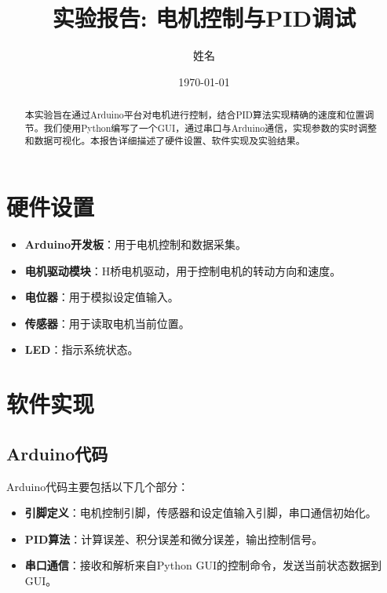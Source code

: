 \documentclass{article}
\title{实验报告: 电机控制与PID调试}
\author{姓名}
\date{\today}
\begin{document}
\maketitle

\begin{abstract}
本实验旨在通过Arduino平台对电机进行控制，结合PID算法实现精确的速度和位置调节。我们使用Python编写了一个GUI，通过串口与Arduino通信，实现参数的实时调整和数据可视化。本报告详细描述了硬件设置、软件实现及实验结果。
\end{abstract}

\section{硬件设置}
\begin{itemize}
    \item \textbf{Arduino开发板}：用于电机控制和数据采集。
    \item \textbf{电机驱动模块}：H桥电机驱动，用于控制电机的转动方向和速度。
    \item \textbf{电位器}：用于模拟设定值输入。
    \item \textbf{传感器}：用于读取电机当前位置。
    \item \textbf{LED}：指示系统状态。
\end{itemize}

\section{软件实现}
\subsection{Arduino代码}
Arduino代码主要包括以下几个部分：
\begin{itemize}
    \item \textbf{引脚定义}：电机控制引脚，传感器和设定值输入引脚，串口通信初始化。
    \item \textbf{PID算法}：计算误差、积分误差和微分误差，输出控制信号。
    \item \textbf{串口通信}：接收和解析来自Python GUI的控制命令，发送当前状态数据到GUI。
\end{itemize}
\end{document}
